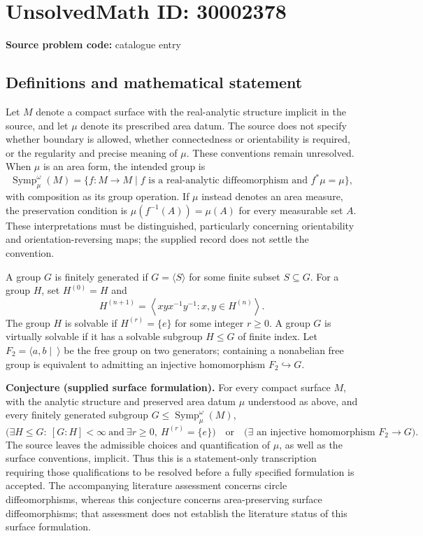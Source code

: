 \documentclass[11pt]{article}
\begin{document}
\section*{UnsolvedMath ID: 30002378}
\textbf{Source problem code:} catalogue entry
\subsection{Definitions and mathematical statement}
Let \(M\) denote a compact surface with the real-analytic structure implicit in the source, and let \(\mu\) denote its prescribed area datum. The source does not specify whether boundary is allowed, whether connectedness or orientability is required, or the regularity and precise meaning of \(\mu\). These conventions remain unresolved. When \(\mu\) is an area form, the intended group is
\[
\operatorname{Symp}^{\omega}_{\mu}(M)
=\{f:M\to M\mid f\text{ is a real-analytic diffeomorphism and }f^{*}\mu=\mu\},
\]
with composition as its group operation. If \(\mu\) instead denotes an area measure, the preservation condition is \(\mu(f^{-1}(A))=\mu(A)\) for every measurable set \(A\). These interpretations must be distinguished, particularly concerning orientability and orientation-reversing maps; the supplied record does not settle the convention.

A group \(G\) is finitely generated if \(G=\langle S\rangle\) for some finite subset \(S\subseteq G\). For a group \(H\), set \(H^{(0)}=H\) and
\[
H^{(n+1)}=\left\langle xyx^{-1}y^{-1}:x,y\in H^{(n)}\right\rangle.
\]
The group \(H\) is solvable if \(H^{(r)}=\{e\}\) for some integer \(r\geq 0\). A group \(G\) is virtually solvable if it has a solvable subgroup \(H\leq G\) of finite index. Let \(F_2=\langle a,b\mid\ \rangle\) be the free group on two generators; containing a nonabelian free group is equivalent to admitting an injective homomorphism \(F_2\hookrightarrow G\).

\textbf{Conjecture (supplied surface formulation).} For every compact surface \(M\), with the analytic structure and preserved area datum \(\mu\) understood as above, and every finitely generated subgroup \(G\leq\operatorname{Symp}^{\omega}_{\mu}(M)\),
\[
\bigl(\exists H\leq G:\ [G:H]<\infty\ \text{and}\ \exists r\geq 0,\ H^{(r)}=\{e\}\bigr)
\quad\text{or}\quad
\bigl(\exists\text{ an injective homomorphism }F_2\to G\bigr).
\]
The source leaves the admissible choices and quantification of \(\mu\), as well as the surface conventions, implicit. Thus this is a statement-only transcription requiring those qualifications to be resolved before a fully specified formulation is accepted. The accompanying literature assessment concerns circle diffeomorphisms, whereas this conjecture concerns area-preserving surface diffeomorphisms; that assessment does not establish the literature status of this surface formulation.
\end{document}
